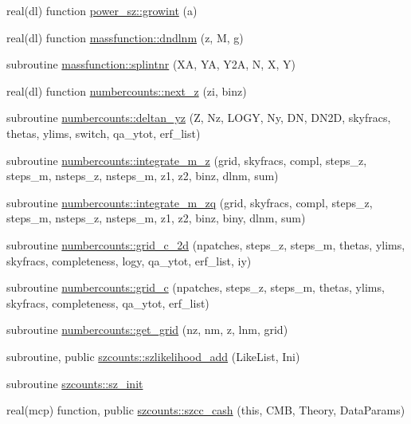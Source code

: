 \begin{DoxyCompactItemize}
real(dl) function \mbox{\hyperlink{namespacepower__sz_ad0eb7df0cb325285d971ac5aa7c80754}{power\+\_\+sz\+::growint}} (a)
\item 
real(dl) function \mbox{\hyperlink{namespacemassfunction_a7388d3e1cd459ef602a588f13111b6f4}{massfunction\+::dndlnm}} (z, M, g)
\item 
subroutine \mbox{\hyperlink{namespacemassfunction_a64c53fdad2880885e6d900d266bd160e}{massfunction\+::splintnr}} (XA, YA, Y2A, N, X, Y)
\item 
real(dl) function \mbox{\hyperlink{namespacenumbercounts_a9dd53df8344f5ed34b320cf13cd342b6}{numbercounts\+::next\+\_\+z}} (zi, binz)
\item 
subroutine \mbox{\hyperlink{namespacenumbercounts_a7e87a46c1e125cb57eff635630c88506}{numbercounts\+::deltan\+\_\+yz}} (Z, Nz, L\+O\+GY, Ny, DN, D\+N2D, skyfracs, thetas, ylims, switch, qa\+\_\+ytot, erf\+\_\+list)
\item 
subroutine \mbox{\hyperlink{namespacenumbercounts_ad089fdedf2c506bc8fc9dfb1ce45c024}{numbercounts\+::integrate\+\_\+m\+\_\+z}} (grid, skyfracs, compl, steps\+\_\+z, steps\+\_\+m, nsteps\+\_\+z, nsteps\+\_\+m, z1, z2, binz, dlnm, sum)
\item 
subroutine \mbox{\hyperlink{namespacenumbercounts_ab1013e4cf6773ad5eef3b128285b1dff}{numbercounts\+::integrate\+\_\+m\+\_\+zq}} (grid, skyfracs, compl, steps\+\_\+z, steps\+\_\+m, nsteps\+\_\+z, nsteps\+\_\+m, z1, z2, binz, biny, dlnm, sum)
\item 
subroutine \mbox{\hyperlink{namespacenumbercounts_a9147710c647a39e457fa04786c7c295d}{numbercounts\+::grid\+\_\+c\+\_\+2d}} (npatches, steps\+\_\+z, steps\+\_\+m, thetas, ylims, skyfracs, completeness, logy, qa\+\_\+ytot, erf\+\_\+list, iy)
\item 
subroutine \mbox{\hyperlink{namespacenumbercounts_ab87ce14039efd094615930acc710e6b2}{numbercounts\+::grid\+\_\+c}} (npatches, steps\+\_\+z, steps\+\_\+m, thetas, ylims, skyfracs, completeness, qa\+\_\+ytot, erf\+\_\+list)
\item 
subroutine \mbox{\hyperlink{namespacenumbercounts_a530ce747969dd91d2b57a90d658dbb62}{numbercounts\+::get\+\_\+grid}} (nz, nm, z, lnm, grid)
\item 
subroutine, public \mbox{\hyperlink{namespaceszcounts_a0c8563799b2d0ed9c6c98a8164fa46b9}{szcounts\+::szlikelihood\+\_\+add}} (Like\+List, Ini)
\item 
subroutine \mbox{\hyperlink{namespaceszcounts_afa324b0c4ff10f2122b6d75541b4e204}{szcounts\+::sz\+\_\+init}}
\item 
real(mcp) function, public \mbox{\hyperlink{namespaceszcounts_abc28ab0b8d2db0b6f91aa9b99cac694f}{szcounts\+::szcc\+\_\+cash}} (this, C\+MB, Theory, Data\+Params)
\end{DoxyCompactItemize}

